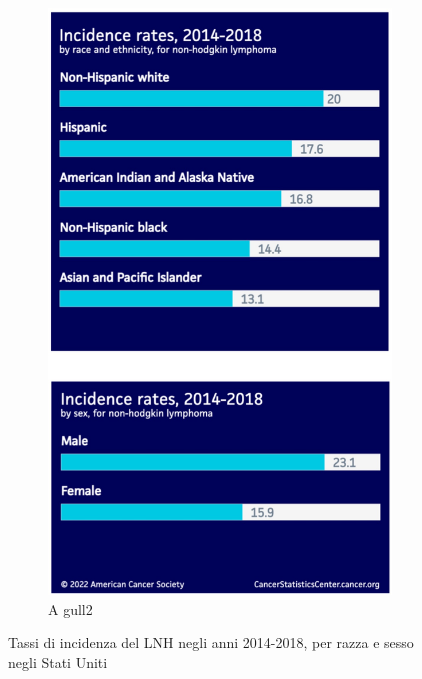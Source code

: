 \begin{figure}
\begin{subfigure}[b]{0.5\textwidth}
    \end{subfigure}
    \begin{subfigure}[b]{0.5\textwidth}
            \includegraphics[width=\linewidth]{img/incidence-rates.JPG}
            \caption{A gull2}
            
    \end{subfigure}
    \caption{Tassi di incidenza del LNH negli anni 2014-2018, per razza e sesso negli Stati Uniti}
\end{figure}

